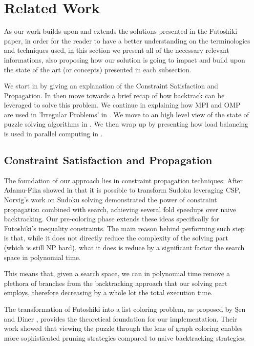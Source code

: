 \section{Related Work}
\label{sec:related_work}
As our work builds upon and extends the solutions presented in the Futoshiki paper, in order for the reader to have a better understanding on the terminologies and techniques used, in this section we present all of the necessary relevant informations, also proposing how our solution is going to impact and build upon the state of the art (or concepts) presented in each subsection. 

We start in  by giving an explanation of the Constraint Satisfaction and Propagation. In  then move towards a brief recap of how backtrack can be leveraged to solve this problem. We continue in explaining how MPI and OMP are used in 'Irregular Problems' in . We move to an high level view of the state of puzzle solving algorithms in . We then wrap up by presenting how load balancing is used in parallel computing in .

\subsection{Constraint Satisfaction and Propagation}
\label{subsec:csp}
The foundation of our approach lies in constraint propagation techniques: After Adamu-Fika showed in \cite{sudoku_csp} that it is possible to transform Sudoku leveraging CSP, Norvig's work on Sudoku solving \cite{NorvigSudoku} demonstrated the power of constraint propagation combined with search, achieving several fold speedups over naive backtracking. Our pre-coloring phase extends these ideas specifically for Futoshiki's inequality constraints. The main reason behind performing such step is that, while it does not directly reduce the complexity of the solving part (which is still NP hard), what it does is reduce by a significant factor the search space in polynomial time. 

This means that, given a search space, we can in polynomial time remove a plethora of branches from the backtracking approach that our solving part employs, therefore decreasing by a whole lot the total execution time.

The transformation of Futoshiki into a list coloring problem, as proposed by Şen and Diner \cite{Sen2024Futoshiki}, provides the theoretical foundation for our implementation. Their work showed that viewing the puzzle through the lens of graph coloring enables more sophisticated pruning strategies compared to naive backtracking strategies. 

